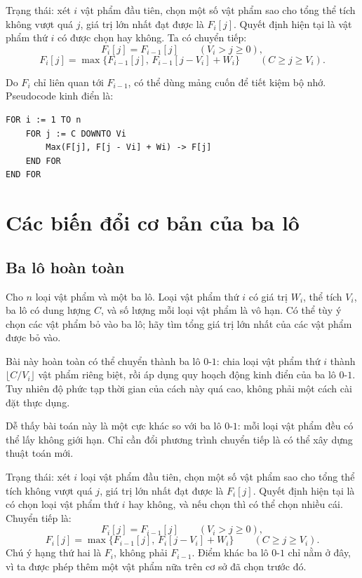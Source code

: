 \documentclass[11pt]{article}
\begin{document}
Trạng thái: xét \(i\) vật phẩm đầu tiên, chọn một số vật phẩm sao cho tổng thể
tích không vượt quá \(j\), giá trị lớn nhất đạt được là \(F_i[j]\). Quyết định
hiện tại là vật phẩm thứ \(i\) có được chọn hay không. Ta có chuyển tiếp:
\[
  F_i[j]=F_{i-1}[j]\qquad (V_i>j\ge 0),
\]
\[
  F_i[j]=\max\{F_{i-1}[j],\,F_{i-1}[j-V_i]+W_i\}
  \qquad (C\ge j\ge V_i).
\]

Do \(F_i\) chỉ liên quan tới \(F_{i-1}\), có thể dùng mảng cuốn để tiết kiệm
bộ nhớ. Pseudocode kinh điển là:

\begin{verbatim}
FOR i := 1 TO n
    FOR j := C DOWNTO Vi
        Max(F[j], F[j - Vi] + Wi) -> F[j]
    END FOR
END FOR
\end{verbatim}

\section{Các biến đổi cơ bản của ba lô}

\subsection{Ba lô hoàn toàn}

Cho \(n\) loại vật phẩm và một ba lô. Loại vật phẩm thứ \(i\) có giá trị
\(W_i\), thể tích \(V_i\), ba lô có dung lượng \(C\), và số lượng mỗi loại vật
phẩm là vô hạn. Có thể tùy ý chọn các vật phẩm bỏ vào ba lô; hãy tìm tổng giá
trị lớn nhất của các vật phẩm được bỏ vào.

Bài này hoàn toàn có thể chuyển thành ba lô \(0\)-\(1\): chia loại vật phẩm
thứ \(i\) thành \(\lfloor C/V_i\rfloor\) vật phẩm riêng biệt, rồi áp dụng quy
hoạch động kinh điển của ba lô \(0\)-\(1\). Tuy nhiên độ phức tạp thời gian
của cách này quá cao, không phải một cách cài đặt thực dụng.

Dễ thấy bài toán này là một cực khác so với ba lô \(0\)-\(1\): mỗi loại vật
phẩm đều có thể lấy không giới hạn. Chỉ cần đổi phương trình chuyển tiếp là có
thể xây dựng thuật toán mới.

Trạng thái: xét \(i\) loại vật phẩm đầu tiên, chọn một số vật phẩm sao cho tổng
thể tích không vượt quá \(j\), giá trị lớn nhất đạt được là \(F_i[j]\). Quyết
định hiện tại là có chọn loại vật phẩm thứ \(i\) hay không, và nếu chọn thì có
thể chọn nhiều cái. Chuyển tiếp là:
\[
  F_i[j]=F_{i-1}[j]\qquad (V_i>j\ge 0),
\]
\[
  F_i[j]=\max\{F_{i-1}[j],\,F_i[j-V_i]+W_i\}
  \qquad (C\ge j\ge V_i).
\]
Chú ý hạng thứ hai là \(F_i\), không phải \(F_{i-1}\). Điểm khác ba lô
\(0\)-\(1\) chỉ nằm ở đây, vì ta được phép thêm một vật phẩm nữa trên cơ sở đã
chọn trước đó.
\end{document}
